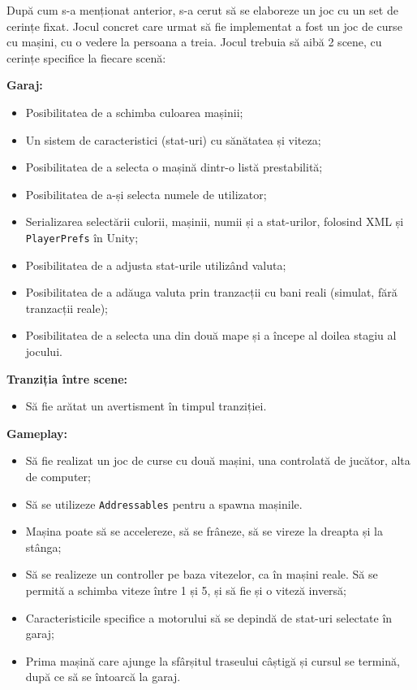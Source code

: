 \documentclass[a4paper,12pt]{report}
\begin{document}
După cum s-a menționat anterior, s-a cerut să se elaboreze un joc cu un set de cerințe fixat.
Jocul concret care urmat să fie implementat a fost un joc de curse cu mașini, cu o vedere la persoana a treia.
Jocul trebuia să aibă 2 scene, cu cerințe specifice la fiecare scenă:

\textbf{Garaj:}
\begin{itemize}
  \item Posibilitatea de a schimba culoarea mașinii;
  \item Un sistem de caracteristici (stat-uri) cu sănătatea și viteza;
  \item Posibilitatea de a selecta o mașină dintr-o listă prestabilită;
  \item Posibilitatea de a-și selecta numele de utilizator;
  \item Serializarea selectării culorii, mașinii, numii și a stat-urilor, folosind \ac{XML} și \texttt{PlayerPrefs} în Unity;
  \item Posibilitatea de a adjusta stat-urile utilizând valuta;
  \item Posibilitatea de a adăuga valuta prin tranzacții cu bani reali (simulat, fără tranzacții reale);
  \item Posibilitatea de a selecta una din două mape și a începe al doilea stagiu al jocului.
\end{itemize}

\textbf{Tranziția între scene:}
\begin{itemize}
  \item Să fie arătat un avertisment în timpul tranziției.
\end{itemize}

\textbf{Gameplay:}
\begin{itemize}
  \item Să fie realizat un joc de curse cu două mașini, una controlată de jucător, alta de computer;
  \item Să se utilizeze \texttt{Addressables} pentru a spawna mașinile.
  \item Mașina poate să se accelereze, să se frâneze, să se vireze la dreapta și la stânga;
  \item Să se realizeze un controller pe baza vitezelor, ca în mașini reale. Să se permită a schimba viteze între 1 și 5, și să fie și o viteză inversă;
  \item Caracteristicile specifice a motorului să se depindă de stat-uri selectate în garaj;
  \item Prima mașină care ajunge la sfârșitul traseului câștigă și cursul se termină, după ce să se întoarcă la garaj.
\end{itemize}
\end{document}
